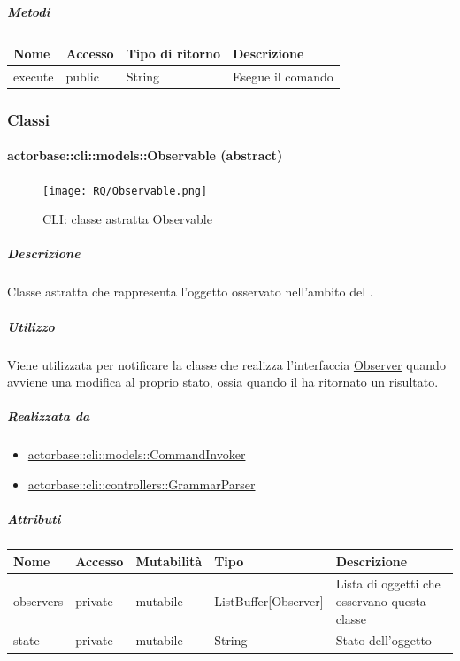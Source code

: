 \documentclass{scalatekids-article}
\begin{document}
\subparagraph{Metodi}

\begin{tabular}{| l | l | l | l |}
  \hline
  Nome & Accesso & Tipo di ritorno & Descrizione\\
  \hline
  execute & public & String & Esegue il comando\\
  \hline
\end{tabular}

\subsubsection{Classi}
\paragraph{actorbase::cli::models::Observable (abstract)}
\label{sec:actorbase::cli::models::Observable}

\begin{figure}[H]
  \begin{center}
    \texttt{[image: RQ/Observable.png]}
    \caption{CLI: classe astratta Observable}
  \end{center}
\end{figure}

\subparagraph{Descrizione}
Classe astratta che rappresenta l'oggetto osservato nell'ambito del  .

\subparagraph{Utilizzo}

Viene utilizzata per notificare la classe che realizza l'interfaccia \hyperref[sec:actorbase::cli::views::Observer]{Observer}
quando avviene una modifica al proprio stato, ossia quando il 
ha ritornato un risultato.

\subparagraph{Realizzata da}
\begin{itemize}
\item \hyperref[sec:actorbase::cli::models::CommandInvoker]{actorbase::cli::models::CommandInvoker}
\item \hyperref[sec:actorbase::cli::controllers::GrammarParser]{actorbase::cli::controllers::GrammarParser}
\end{itemize}

\subparagraph{Attributi}

\begin{tabular}{| p{1.5cm} | p{1.5cm} | p{2cm} | p{3.5cm} | p{8.5cm} |}
  \hline
  Nome & Accesso & Mutabilità & Tipo & Descrizione\\
  \hline
  observers & private & mutabile & ListBuffer[Observer] & Lista di oggetti che osservano questa classe\\
  \hline
  state & private & mutabile & String & Stato dell'oggetto\\
  \hline
\end{tabular}
\end{document}
